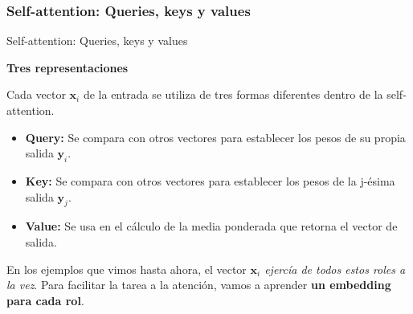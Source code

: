 \documentclass[aspectratio=169]{beamer}
\newenvironment{blockm}[1]{%
  \begin{block}{\textbf{#1}}%
  }{%
  \end{block}%
  \vspace{1em}%
}
\begin{document}
\subsubsection{Self-attention: Queries, keys y values}

\begin{frame}{Self-attention: Queries, keys y values}

  \begin{blockm}{Tres representaciones}
    Cada vector $\mathbf{x}_{i}$ de la entrada se utiliza de tres formas diferentes dentro de la self-attention.
  \end{blockm}
  \begin{itemize}
    \item \textbf{Query:} Se compara con otros vectores para establecer los pesos de su propia salida $\mathbf{y}_{i}$.
    \item \textbf{Key:} Se compara con otros vectores para establecer los pesos de la j-ésima salida $\mathbf{y}_{j}$.
    \item \textbf{Value:} Se usa en el cálculo de la media ponderada que retorna el vector de salida. 
  \end{itemize}
  \vspace{.3cm}
  \begin{block}{}
    En los ejemplos que vimos hasta ahora, el vector \emph{$\mathbf{x}_{i}$ ejercía de todos estos roles a la vez}. Para facilitar la tarea a la atención, vamos a aprender \textbf{un embedding para cada rol}.
  \end{block}

\end{frame}
\end{document}
